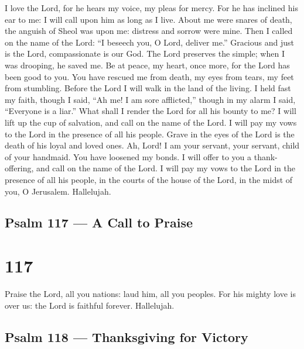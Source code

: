  I love the Lord, for he hears my voice, my pleas for mercy.
 For he has inclined his ear to me: I will call upon him as
long as I live.  About me were snares of death, the anguish
of Sheol was upon me: distress and sorrow were mine.  Then I
called on the name of the Lord: ``I beseech you, O Lord, deliver me.''
 Gracious and just is the Lord, compassionate is our God.
 The Lord preserves the simple; when I was drooping, he
saved me.  Be at peace, my heart, once more, for the Lord
has been good to you.  You have rescued me from death, my
eyes from tears, my feet from stumbling.  Before the Lord I
will walk in the land of the living.  I held fast my faith,
though I said, ``Ah me! I am sore afflicted,''  though in
my alarm I said, ``Everyone is a liar.''  What shall I
render the Lord for all his bounty to me?  I will lift up
the cup of salvation, and call on the name of the Lord.  I
will pay my vows to the Lord in the presence of all his people.
 Grave in the eyes of the Lord is the death of his loyal
and loved ones.  Ah, Lord! I am your servant, your servant,
child of your handmaid. You have loosened my bonds.  I will
offer to you a thank-offering, and call on the name of the Lord.
 I will pay my vows to the Lord in the presence of all his
people,  in the courts of the house of the Lord, in the
midst of you, O Jerusalem. Hallelujah.

\hypertarget{psalm-117-a-call-to-praise}{%
\subsection{Psalm 117 --- A Call to
Praise}\label{psalm-117-a-call-to-praise}}

\hypertarget{section-116}{%
\section{117}\label{section-116}}

 Praise the Lord, all you nations: laud him, all you
peoples.  For his mighty love is over us: the Lord is
faithful forever. Hallelujah.

\hypertarget{psalm-118-thanksgiving-for-victory}{%
\subsection{Psalm 118 --- Thanksgiving for
Victory}\label{psalm-118-thanksgiving-for-victory}}

